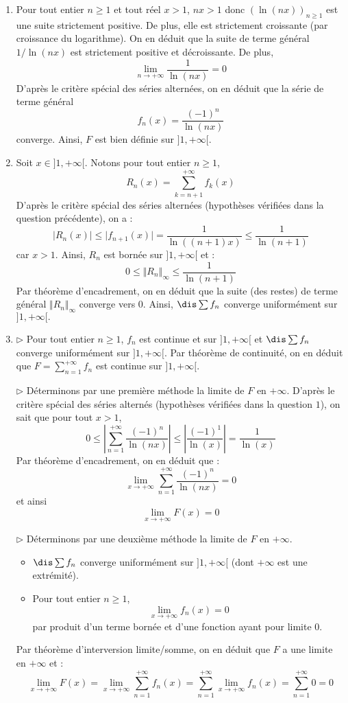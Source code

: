 \documentclass[a4paper,10pt]{report}
\begin{document}
\corr  

\begin{enumerate}
\item Pour tout entier $n \geq 1$ et tout réel $x>1$, $nx>1$ donc $(\ln(nx))_{n \geq 1}$ est une suite strictement positive. De plus, elle est strictement croissante (par croissance du logarithme). On en déduit que la suite de terme général $1/\ln(nx)$ est strictement positive et décroissante. De plus,
$$ \lim_{n \rightarrow + \infty} \dfrac{1}{\ln(nx)} = 0$$
D'après le critère spécial des séries alternées, on en déduit que la série de terme général 
$$ f_n(x)  =\frac{(-1)^n}{\ln(nx)}$$
converge. Ainsi, $F$ est bien définie sur $]1, + \infty[$.
\item Soit $x \in ]1, + \infty[$. Notons pour tout entier $n \geq 1$,
$$ R_n(x) = \sum_{k=n+1}^{+ \infty} f_k(x)$$
D'après le critère spécial des séries alternées (hypothèses vérifiées dans la question précédente), on a :
$$ \vert R_n(x) \vert \leq \vert f_{n+1}(x) \vert  = \dfrac{1}{\ln((n+1)x)} \leq \dfrac{1}{\ln(n+1)}$$
car $x>1$. Ainsi, $R_n$ est bornée sur $]1, + \infty[$ et :
$$ 0 \leq \Vert R_n \Vert_{\infty} \leq \dfrac{1}{\ln(n+1)}$$
Par théorème d'encadrement, on en déduit que la suite (des restes) de terme général $ \Vert R_n \Vert_{\infty}$ converge vers $0$. Ainsi, $\dis\sum f_n$ converge uniformément sur $]1,+\infty[.$ 
\item 

\noindent $\rhd$ Pour tout entier $n \geq 1$, $f_n$ est continue et sur $]1, + \infty[$ et $\dis\sum f_n$ converge uniformément sur $]1,+\infty[.$ Par théorème de continuité, on en déduit que $F= \sum_{n=1}^{+ \infty} f_n$ est continue sur $]1, + \infty[$.

\medskip

\noindent $\rhd$ Déterminons par une première méthode la limite de $F$ en $+ \infty$. D'après le critère spécial des séries alternés (hypothèses vérifiées dans la question $1$), on sait que pour tout $x>1$,
$$ 0 \leq \left\vert \sum_{n=1}^{+ \infty} \dfrac{(-1)^n}{\ln(nx)} \right\vert \leq \left\vert \dfrac{(-1)^1}{\ln(x)} \right\vert = \dfrac{1}{\ln(x)}$$
Par théorème d'encadrement, on en déduit que :
$$ \lim_{x \rightarrow + \infty} \sum_{n=1}^{+ \infty} \dfrac{(-1)^n}{\ln(nx)} = 0$$
et ainsi
$$ \lim_{x \rightarrow + \infty} F(x)= 0$$

\medskip

\noindent $\rhd$ Déterminons par une deuxième méthode la limite de $F$ en $+ \infty$.

\begin{itemize}
\item $\dis\sum f_n$ converge uniformément sur $]1,+\infty[$ (dont $+ \infty$ est une extrémité).
\item Pour tout entier $n \geq 1$,
$$ \lim_{x \rightarrow + \infty} f_n(x) = 0$$
par produit d'un terme bornée et d'une fonction ayant pour limite $0$.
\end{itemize}
Par théorème d'interversion limite/somme, on en déduit que $F$ a une limite en $+ \infty$ et :
$$ \lim_{x \rightarrow + \infty}  F(x) = \lim_{x \rightarrow + \infty} \sum_{n=1}^{+ \infty} f_n(x) =  \sum_{n=1}^{+ \infty} \lim_{x \rightarrow + \infty} f_n(x)=   \sum_{n=1}^{+ \infty}  0 = 0$$


\end{enumerate}
\end{document}
